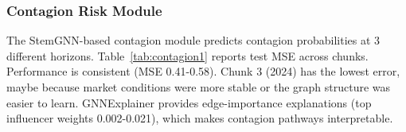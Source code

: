 \documentclass[conference]{IEEEtran}
\begin{document}
\subsubsection{Contagion Risk Module}
The StemGNN-based contagion module predicts contagion probabilities at 3 different horizons. Table~\ref{tab:contagion1} reports test MSE across chunks. Performance is consistent (MSE 0.41-0.58). Chunk 3 (2024) has the lowest error, maybe because market conditions were more stable or the graph structure was easier to learn. GNNExplainer provides edge-importance explanations (top influencer weights 0.002-0.021), which makes contagion pathways interpretable.
\end{document}
